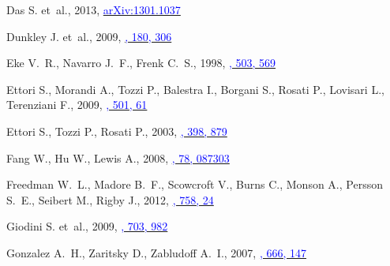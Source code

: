 \documentclass[useAMS,usenatbib,usegraphicx]{mn2e}
\begin{document}
\begin{thebibliography}{}
{Das} S. et~al., 2013,
  \href{http://arxiv.org/abs/1301.1037}{\textcolor{blue}{arXiv:1301.1037}}

{Dunkley} J. et~al., 2009,
  \href{http://adsabs.harvard.edu/abs/2009ApJS..180..306D}{\textcolor{blue}{\apjs,
  180, 306}}

{Eke} V.~R., {Navarro} J.~F.,  {Frenk} C.~S., 1998,
  \href{http://adsabs.harvard.edu/abs/1998ApJ...503..569E}{\textcolor{blue}{\apj,
  503, 569}}

{Ettori} S., {Morandi} A., {Tozzi} P., {Balestra} I., {Borgani} S., {Rosati}
  P., {Lovisari} L.,  {Terenziani} F., 2009,
  \href{http://adsabs.harvard.edu/abs/2009A%26A...501...61E}{\textcolor{blue}{\aap,
  501, 61}}

{Ettori} S., {Tozzi} P.,  {Rosati} P., 2003,
  \href{http://adsabs.harvard.edu/abs/2003A%26A...398..879E}{\textcolor{blue}{\aap,
  398, 879}}

{Fang} W., {Hu} W.,  {Lewis} A., 2008,
  \href{http://adsabs.harvard.edu/abs/2008PhRvD..78h7303F}{\textcolor{blue}{\prd,
  78, 087303}}

{Freedman} W.~L., {Madore} B.~F., {Scowcroft} V., {Burns} C., {Monson} A.,
  {Persson} S.~E., {Seibert} M.,  {Rigby} J., 2012,
  \href{http://adsabs.harvard.edu/abs/2012ApJ...758...24F}{\textcolor{blue}{\apj,
  758, 24}}

{Giodini} S. et~al., 2009,
  \href{http://adsabs.harvard.edu/abs/2009ApJ...703..982G}{\textcolor{blue}{\apj,
  703, 982}}

{Gonzalez} A.~H., {Zaritsky} D.,  {Zabludoff} A.~I., 2007,
  \href{http://adsabs.harvard.edu/abs/2007ApJ...666..147G}{\textcolor{blue}{\apj,
  666, 147}}


\end{thebibliography}
\end{document}
